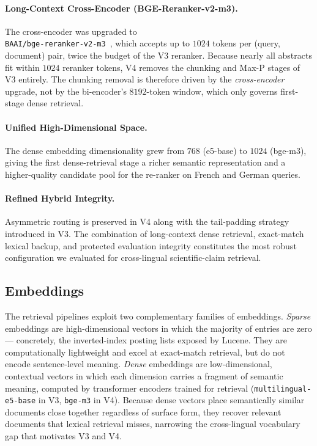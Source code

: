 \paragraph{Long-Context Cross-Encoder (BGE-Reranker-v2-m3).}
The cross-encoder was upgraded to
\\ \texttt{BAAI/bge-reranker-v2-m3}~\citep{ChenEtAl2024BGEM3}, which
accepts up to $1024$ tokens per (query, document) pair, twice the
budget of the V3 reranker.  Because nearly all abstracts fit within
$1024$ reranker tokens, V4 removes the chunking and Max-P stages of
V3 entirely.  The chunking removal is therefore driven by the
\emph{cross-encoder} upgrade, not by the bi-encoder's $8192$-token
window, which only governs first-stage dense retrieval.

\paragraph{Unified High-Dimensional Space.}
The dense embedding dimensionality grew from $768$ (e5-base) to
$1024$ (bge-m3), giving the first dense-retrieval stage a richer
semantic representation and a higher-quality candidate pool for the
re-ranker on French and German queries.

\paragraph{Refined Hybrid Integrity.}
Asymmetric routing is preserved in V4 along with the tail-padding
strategy introduced in V3.  The combination of long-context dense
retrieval, exact-match lexical backup, and protected evaluation
integrity constitutes the most robust configuration we evaluated for
cross-lingual scientific-claim retrieval.

\subsection{Embeddings}
\label{subsec:embeddings}

The retrieval pipelines exploit two complementary families of
embeddings.  \emph{Sparse} embeddings are high-dimensional vectors
in which the majority of entries are zero — concretely, the
inverted-index posting lists exposed by Lucene.  They are
computationally lightweight and excel at exact-match retrieval, but
do not encode sentence-level meaning.  \emph{Dense} embeddings are
low-dimensional, contextual vectors in which each dimension carries
a fragment of semantic meaning, computed by transformer encoders
trained for retrieval (\texttt{multilingual-e5-base} in V3,
\texttt{bge-m3} in V4).  Because dense vectors place semantically
similar documents close together regardless of surface form, they
recover relevant documents that lexical retrieval misses, narrowing
the cross-lingual vocabulary gap that motivates V3 and V4.